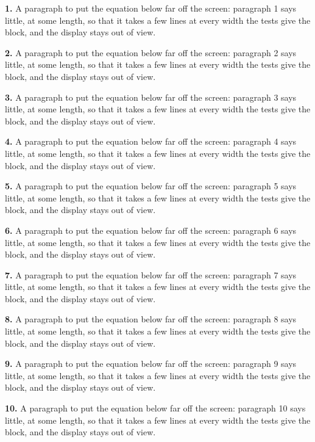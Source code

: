 \noindent\textbf{1.} A paragraph to put the equation below far off the screen: paragraph 1
says little, at some length, so that it takes a few lines at every width
the tests give the block, and the display stays out of view.

\noindent\textbf{2.} A paragraph to put the equation below far off the screen: paragraph 2
says little, at some length, so that it takes a few lines at every width
the tests give the block, and the display stays out of view.

\noindent\textbf{3.} A paragraph to put the equation below far off the screen: paragraph 3
says little, at some length, so that it takes a few lines at every width
the tests give the block, and the display stays out of view.

\noindent\textbf{4.} A paragraph to put the equation below far off the screen: paragraph 4
says little, at some length, so that it takes a few lines at every width
the tests give the block, and the display stays out of view.

\noindent\textbf{5.} A paragraph to put the equation below far off the screen: paragraph 5
says little, at some length, so that it takes a few lines at every width
the tests give the block, and the display stays out of view.

\noindent\textbf{6.} A paragraph to put the equation below far off the screen: paragraph 6
says little, at some length, so that it takes a few lines at every width
the tests give the block, and the display stays out of view.

\noindent\textbf{7.} A paragraph to put the equation below far off the screen: paragraph 7
says little, at some length, so that it takes a few lines at every width
the tests give the block, and the display stays out of view.

\noindent\textbf{8.} A paragraph to put the equation below far off the screen: paragraph 8
says little, at some length, so that it takes a few lines at every width
the tests give the block, and the display stays out of view.

\noindent\textbf{9.} A paragraph to put the equation below far off the screen: paragraph 9
says little, at some length, so that it takes a few lines at every width
the tests give the block, and the display stays out of view.

\noindent\textbf{10.} A paragraph to put the equation below far off the screen: paragraph 10
says little, at some length, so that it takes a few lines at every width
the tests give the block, and the display stays out of view.

